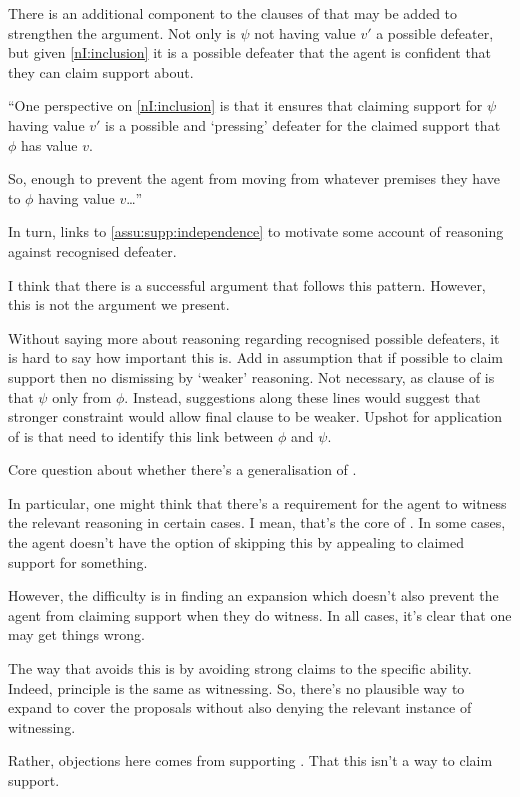 \begin{note}
  There is an additional component to the clauses of \nI{} that may be added to strengthen the argument.
  Not only is \(\psi\) not having value \(v'\) a possible defeater, but given \ref{nI:inclusion} it is a possible defeater that the agent is confident that they can claim support about.

  ``One perspective on \ref{nI:inclusion} is that it ensures that claiming support for \(\psi\) having value \(v'\) is a possible and `pressing' defeater for the claimed support that \(\phi\) has value \(v\).

  So, enough to prevent the agent from moving from whatever premises they have to \(\phi\) having value \(v\)\dots''

  {
    \color{red}
     In turn, links to \autoref{assu:supp:independence} to motivate some account of reasoning against recognised defeater.

  I think that there is a successful argument that follows this pattern.
  However, this is not the argument we present.
  }

  Without saying more about reasoning regarding recognised possible defeaters, it is hard to say how important this is.
  Add in assumption that if possible to claim support then no dismissing by `weaker' reasoning.
  Not necessary, as clause of \nI{} is that \(\psi\) only from \(\phi\).
  Instead, suggestions along these lines would suggest that \nI{} stronger constraint would allow final clause to be weaker.
  Upshot for application of \nI{} is that need to identify this link between \(\phi\) and \(\psi\).
\end{note}

\begin{note}[Generalising \nI{}]
  Core question about whether there's a generalisation of \nI{}.

  In particular, one might think that there's a requirement for the agent to witness the relevant reasoning in certain cases.
  I mean, that's the core of \nI{}.
  In some cases, the agent doesn't have the option of skipping this by appealing to claimed support for something.

  However, the difficulty is in finding an expansion which doesn't also prevent the agent from claiming support when they do witness.
  In all cases, it's clear that one may get things wrong.

  The way that \adB{} avoids this is by avoiding strong claims to the specific ability.
  Indeed, principle is the same as witnessing.
  So, there's no plausible way to expand \nI{} to cover the proposals without also denying the relevant instance of witnessing.

  Rather, objections here comes from supporting \ESU{}.
  That this isn't a way to claim support.
\end{note}

